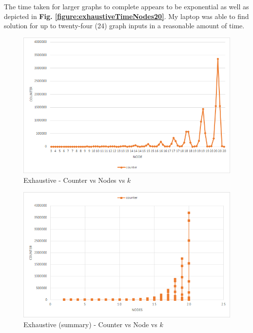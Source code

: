 \documentclass[longpaper, english, final, times]{revdetua}
\begin{document}
			The time taken for larger graphs to complete appears to be exponential as well as depicted in \textbf{Fig. \ref{figure:exhaustiveTimeNodes20}}. My laptop was able to find solution for up to twenty-four (24) graph inputs in a reasonable amount of time.
			
			\begin{figure}[h]
				\includegraphics[width=1\linewidth]{imgs/exhaustiveCounterNodes20.png}
				\caption{Exhaustive - Counter vs Nodes vs $k$}
				\label{figure:exhaustiveCounterNodes20}
			\end{figure}
		
			\begin{figure}[!h]
				\includegraphics[width=1\linewidth]{imgs/exhaustiveCounterNodesSummary.png}
				\caption{Exhaustive (summary) - Counter vs Node vs $k$}
				\label{figure:exhaustiveCounterNodesSummary}
			\end{figure}
		
\end{document}
